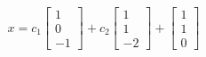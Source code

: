 \documentclass[11pt,a4paper]{article}
\begin{document}
\begin{equation}
    x = c_1 \begin{bmatrix} 1 \\ 0 \\ -1 \end{bmatrix}
        + c_2 \begin{bmatrix} 1 \\ 1 \\ -2 \end{bmatrix}
            + \begin{bmatrix} 1 \\ 1 \\ 0 \end{bmatrix}
\end{equation}
\end{document}
